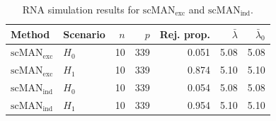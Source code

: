 \begin{table}[H]
\scriptsize
\centering
\caption{RNA simulation results for $\mathrm{scMAN}_{\mathrm{exc}}$ and $\mathrm{scMAN}_{\mathrm{ind}}$.}
\label{tab:rna_dataset}
\begin{tabular}{llrrrrr}
\toprule
Method & Scenario & $n$ & $p$ & Rej. prop. & $\bar\lambda$ & $\bar\lambda_0$ \\
\midrule
$\mathrm{scMAN}_{\mathrm{exc}}$ & $H_0$ & 10 & 339 & 0.051 & 5.08 & 5.08 \\
$\mathrm{scMAN}_{\mathrm{exc}}$ & $H_1$ & 10 & 339 & 0.874 & 5.10 & 5.10 \\
$\mathrm{scMAN}_{\mathrm{ind}}$ & $H_0$ & 10 & 339 & 0.054 & 5.08 & 5.08 \\
$\mathrm{scMAN}_{\mathrm{ind}}$ & $H_1$ & 10 & 339 & 0.954 & 5.10 & 5.10 \\
\bottomrule
\end{tabular}
\end{table}
